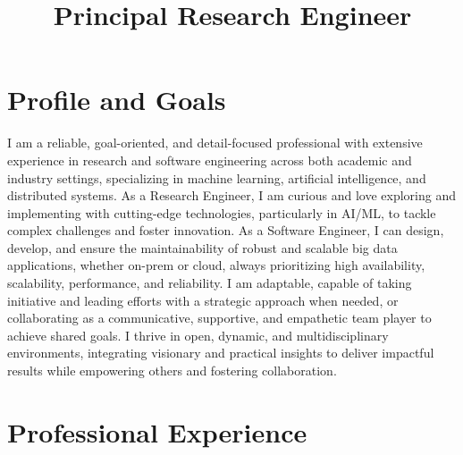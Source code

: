 \documentclass[11pt,a4paper,english, sans]{moderncv}      %
\title{Principal Research Engineer}            %
\begin{document}
\maketitle
\vspace{-0.5cm}

\section{Profile and Goals}

\small I am a reliable, goal-oriented, and detail-focused professional with extensive experience in research and software engineering across both academic and industry settings, specializing in machine learning, artificial intelligence, and distributed systems. As a Research Engineer, I am curious and love exploring and implementing with cutting-edge technologies, particularly in AI/ML, to tackle complex challenges and foster innovation. As a Software Engineer, I can design, develop, and ensure the maintainability of robust and scalable big data applications, whether on-prem or cloud, always prioritizing high availability, scalability, performance, and reliability. I am adaptable, capable of taking initiative and leading efforts with a strategic approach when needed, or collaborating as a communicative, supportive, and empathetic team player to achieve shared goals. I thrive in open, dynamic, and multidisciplinary environments, integrating visionary and practical insights to deliver impactful results while empowering others and fostering collaboration.

\section{Professional Experience}


\end{document}
